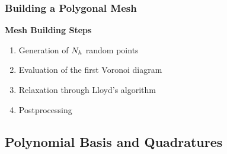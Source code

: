 \begin{frame} %
    \frametitle{Building a Polygonal Mesh}

    \vspace*{\fill}
    \begin{multicols}{2}
        
        \vspace*{\fill}
        \begin{center}
            {\color{\accentcolor} \Large \textbf{Mesh Building Steps}}
            \vspace*{0.5cm}

            \begin{minipage}{0.4\textwidth}
                \begin{enumerate}
                    \item Generation of $N_h$ random points
                    \item Evaluation of the first Voronoi diagram
                    \item Relaxation through Lloyd's algorithm
                    \item {\color{\accentcolor} Postprocessing}
                \end{enumerate}
            \end{minipage}
        \end{center}
        \vspace*{\fill}

        \vfill\null
        \columnbreak

        \vspace*{\fill}
        \begin{figure}[!ht]
            \centering
            
        \end{figure}
        \vspace*{\fill}

    \end{multicols}
    \vspace*{\fill}
    
\end{frame}

\subsection{Polynomial Basis and Quadratures}


